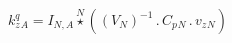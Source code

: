 \documentclass[border=2pt]{standalone}
\begin{document}
${{k^q_z}}{_{A}}={{I}}{_{N, A}} \stackrel{N}{\star} \left(\left( {V}{_{N}} \right)^{-1} \, . \, {{C_p}}{_{N}} \, . \, {{v_z}}{_{N}}\right)$
\end{document}
